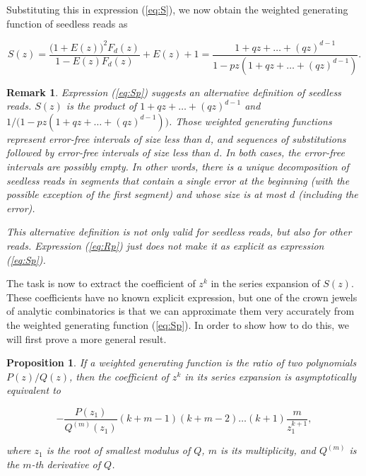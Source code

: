 \documentclass{article}
\newtheorem{proposition}{Proposition}
\newtheorem{remark}{Remark}
\begin{document}
Substituting this in expression (\ref{eq:S}), we now obtain the weighted
generating function of seedless reads as

\begin{equation}
\label{eq:Sp}
S(z) = \frac{\big(1+E(z)\big)^2F_d(z)}{1-E(z)F_d(z)} + E(z) + 1 =
\frac{1+qz + \ldots + (qz)^{d-1}}{1-pz(1+qz + \ldots +
(qz)^{d-1})}.
\end{equation}

\begin{remark}
\label{rem:alt}
Expression (\ref{eq:Sp}) suggests an alternative definition of seedless
reads. $S(z)$ is the product of $1+qz + \ldots + (qz)^{d-1}$ and
$1/\big(1-pz(1+qz + \ldots+(qz)^{d-1})\big)$. Those weighted generating
functions represent error-free intervals of size less than $d$, and
sequences of substitutions followed by error-free intervals of size less
than $d$. In both cases, the error-free intervals are possibly empty.
In other words, there is a unique decomposition of seedless reads
in segments that contain a single error at the beginning (with the
possible exception of the first segment) and whose size is at most $d$
(including the error).

This alternative definition is not only valid for seedless reads, but also
for other reads. Expression (\ref{eq:Rp}) just does not make it as
explicit as expression (\ref{eq:Sp}).
\end{remark}

The task is now to extract the coefficient of $z^k$ in the series
expansion of $S(z)$. These coefficients have no known explicit expression,
but one of the crown jewels of analytic combinatorics is that we can
approximate them very accurately from the weighted generating function
(\ref{eq:Sp}). In order to show how to do this, we will first prove a more
general result.

\begin{proposition}
\label{th:ass}
If a weighted generating function is the ratio of two polynomials
$P(z)/Q(z)$, then the coefficient of $z^k$ in its series expansion is
asymptotically equivalent to

\begin{equation}
\label{eq:ass}
-\frac{P(z_1)}{Q^{(m)}(z_1)}(k+m-1)(k+m-2)
  \ldots(k+1)\frac{m}{z_1^{k+1}},
\end{equation}

\noindent
where $z_1$ is the root of smallest modulus of $Q$, $m$ is its
multiplicity, and $Q^{(m)}$ is the $m$-th derivative of $Q$.
\end{proposition}
\end{document}
